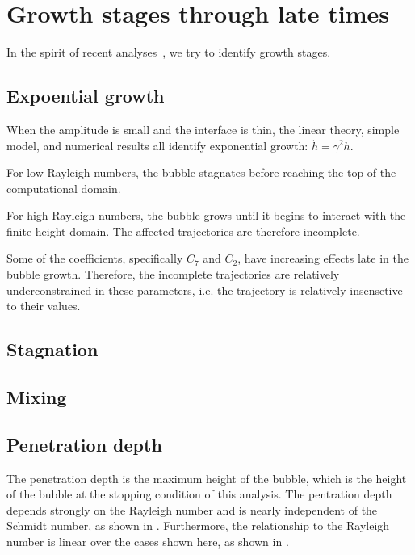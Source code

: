 \section{Growth stages through late times}

In the spirit of recent analyses~\cite{Ramaprabhu2012, Wei2012}, we try to identify growth stages.

\subsection{Expoential growth}
When the amplitude is small and the interface is thin, the linear theory, simple model, and numerical results all identify exponential growth: $\ddot{h} = \gamma^2 h$.

For low Rayleigh numbers, the bubble stagnates before reaching the top of the computational domain.

For high Rayleigh numbers, the bubble grows until it begins to interact with the finite height domain.
The affected trajectories are therefore incomplete.

Some of the coefficients, specifically $C_7$ and $C_2$, have increasing effects late in the bubble growth.
Therefore, the incomplete trajectories are relatively underconstrained in these parameters, i.e. the trajectory is relatively insensetive to their values.



\subsection{Stagnation}

\subsection{Mixing}

\subsection{Penetration depth}

The penetration depth is the maximum height of the bubble, which is the height of the bubble at the stopping condition of this analysis.
The pentration depth depends strongly on the Rayleigh number and is nearly independent of the Schmidt number, as shown in .
Furthermore, the relationship to the Rayleigh number is linear over the cases shown here, as shown in .

